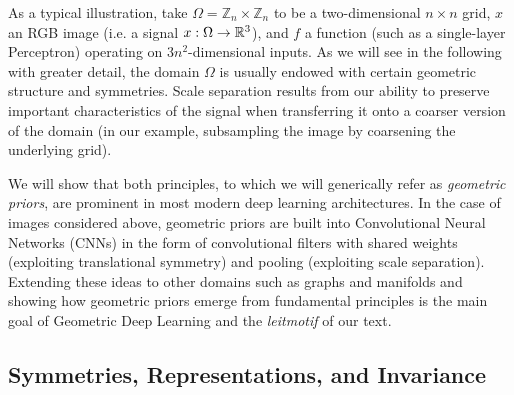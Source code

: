 As a typical illustration, take $\Omega = \mathbb{Z}_n\times \mathbb{Z}_n$ to be a two-dimensional $n\times n$ grid, $x$ an RGB image (i.e. a signal $x : \Omega \rightarrow \mathbb{R}^3$), and $f$ a function (such as a single-layer Perceptron) operating on $3n^2$-dimensional inputs. 
%
As we will see in the following with greater detail, the domain $\Omega$ is usually endowed with certain geometric structure and symmetries. %
%
Scale separation results from our ability to preserve important characteristics of the signal when transferring it onto a coarser version of the domain (in our example, subsampling the image by coarsening the underlying grid). 


We will show that both principles, to which we will generically refer as {\em geometric priors}, are prominent in most modern deep learning architectures. In the case of images considered above, geometric priors are built into Convolutional Neural Networks (CNNs) in the form of convolutional filters with shared weights (exploiting translational symmetry) and pooling (exploiting scale separation). 
%
Extending these ideas to other domains such as graphs and manifolds and showing how geometric priors emerge from fundamental principles is the main goal of Geometric Deep Learning and the {\em leitmotif} of our text.   



\subsection{Symmetries, Representations, and Invariance}
\label{sec:symmetries}


